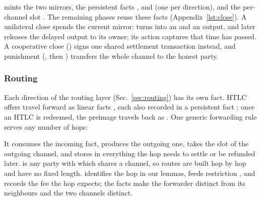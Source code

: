  mints the two mirrors, the persistent facts
,  and  (one per
direction), and the per-channel slot . The remaining phases reuse these facts
(Appendix~\ref{lst:close}). A unilateral close spends the current mirror:
 turns  into an  and an
 output, and  later releases the delayed output to its
owner; its action  captures that time has passed. A cooperative close
() signs one shared settlement transaction instead, and punishment
(, then ) transfers the whole channel to the honest party.

\subsubsection{Routing}\label{sec:core-routing}
Each direction of the routing layer (Sec.~\ref{sec:routing}) has its own fact. HTLC
offers travel forward as linear facts , each also recorded in a
persistent fact ; once an HTLC is redeemed, the preimage travels back as
. One generic forwarding rule serves any number of hops:
It consumes the incoming  fact, produces the outgoing one, takes the slot of the
outgoing channel, and stores in 
everything the hop needs to settle or be refunded later.  is any party with which
 shares a channel, so routes are built hop by hop and have no fixed length.
 identifies the hop in our lemmas,  feeds restriction
, and  records the fee the hop expects; the
 facts make the forwarder distinct from its neighbours and the two channels distinct.

